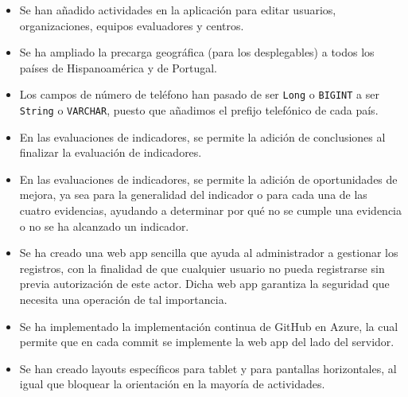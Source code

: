 \begin{itemize}
\begin{lstlisting}
    \end{lstlisting}
    \item Se han añadido actividades en la aplicación para editar usuarios, organizaciones, equipos evaluadores y centros.
    \item Se ha ampliado la precarga geográfica (para los desplegables) a todos los países de Hispanoamérica y de Portugal.
    \item Los campos de número de teléfono han pasado de ser \texttt{Long} o
    \texttt{BIGINT} a ser \texttt{String} o \texttt{VARCHAR}, puesto que añadimos el prefijo telefónico de cada país.
    \item En las evaluaciones de indicadores, se permite la adición de conclusiones al finalizar la evaluación de indicadores.
    \item En las evaluaciones de indicadores, se permite la adición de
    oportunidades de mejora, ya sea para la generalidad del indicador o para
    cada una de las cuatro evidencias, ayudando a determinar por qué no se
    cumple una evidencia o no se ha alcanzado un indicador.
    \item Se ha creado una web app sencilla que ayuda al administrador a
    gestionar los registros, con la finalidad de que cualquier usuario no pueda
    registrarse sin previa autorización de este actor. Dicha web
    app\cite{guiaoteaadminHerramientaAdministracixF3n} garantiza la seguridad
    que necesita una operación de tal importancia.
    \item Se ha implementado la implementación continua de GitHub en Azure, la
    cual permite que en cada commit se implemente la web app del lado del
    servidor.
    \item Se han creado layouts específicos para tablet y para pantallas
    horizontales, al igual que bloquear la orientación en la mayoría de
    actividades.
\end{itemize}

